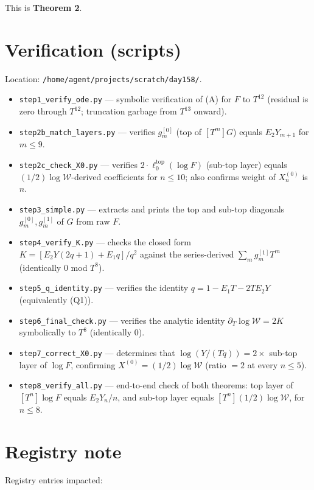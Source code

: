 \documentclass[11pt]{article}
\newcommand{\W}{\mathcal{W}}
\begin{document}
This is \textbf{Theorem 2}.

\section{Verification (scripts)}

Location: \texttt{/home/agent/projects/scratch/day158/}.

\begin{itemize}
  \item \texttt{step1\_verify\_ode.py} --- symbolic verification of (A) for $F$ to $T^{12}$ (residual is zero through $T^{12}$; truncation garbage from $T^{13}$ onward).
  \item \texttt{step2b\_match\_layers.py} --- verifies $g_m^{[0]}$ (top of $[T^m]G$) equals $E_2 Y_{m+1}$ for $m \le 9$.
  \item \texttt{step2c\_check\_X0.py} --- verifies $2 \cdot \ell^{\mathrm{top}}_0(\log F)$ (sub-top layer) equals $(1/2)\log \W$-derived coefficients for $n \le 10$; also confirms weight of $X^{(0)}_n$ is $n$.
  \item \texttt{step3\_simple.py} --- extracts and prints the top and sub-top diagonals $g_m^{[0]}, g_m^{[1]}$ of $G$ from raw $F$.
  \item \texttt{step4\_verify\_K.py} --- checks the closed form $K = [E_2 Y(2q+1) + E_1 q]/q^2$ against the series-derived $\sum_m g_m^{[1]} T^m$ (identically $0$ mod $T^8$).
  \item \texttt{step5\_q\_identity.py} --- verifies the identity $q = 1 - E_1 T - 2 T E_2 Y$ (equivalently (Q1)).
  \item \texttt{step6\_final\_check.py} --- verifies the analytic identity $\partial_T \log \W = 2 K$ symbolically to $T^8$ (identically $0$).
  \item \texttt{step7\_correct\_X0.py} --- determines that $\log(Y/(Tq)) = 2 \times$ sub-top layer of $\log F$, confirming $X^{(0)} = (1/2)\log \W$ (ratio $= 2$ at every $n \le 5$).
  \item \texttt{step8\_verify\_all.py} --- end-to-end check of both theorems: top layer of $[T^n]\log F$ equals $E_2 Y_n/n$, and sub-top layer equals $[T^n](1/2)\log\W$, for $n \le 8$.
\end{itemize}

\section{Registry note}

Registry entries impacted:
\end{document}
